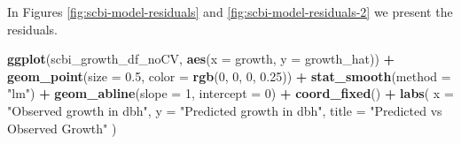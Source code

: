 \documentclass[12pt]{article}
\newenvironment{Shaded}{\begin{snugshade}}{\end{snugshade}}
\newcommand{\CommentTok}[1]{\textcolor[rgb]{0.56,0.35,0.01}{\textit{#1}}}
\newcommand{\DataTypeTok}[1]{\textcolor[rgb]{0.13,0.29,0.53}{#1}}
\newcommand{\DecValTok}[1]{\textcolor[rgb]{0.00,0.00,0.81}{#1}}
\newcommand{\FloatTok}[1]{\textcolor[rgb]{0.00,0.00,0.81}{#1}}
\newcommand{\KeywordTok}[1]{\textcolor[rgb]{0.13,0.29,0.53}{\textbf{#1}}}
\newcommand{\NormalTok}[1]{#1}
\newcommand{\OperatorTok}[1]{\textcolor[rgb]{0.81,0.36,0.00}{\textbf{#1}}}
\newcommand{\OtherTok}[1]{\textcolor[rgb]{0.56,0.35,0.01}{#1}}
\newcommand{\StringTok}[1]{\textcolor[rgb]{0.31,0.60,0.02}{#1}}
\begin{document}
\begin{Shaded}
\end{Shaded}

\begin{Shaded}
\end{Shaded}

\begin{Shaded}
\end{Shaded}

In Figures \ref{fig:scbi-model-residuals} and
\ref{fig:scbi-model-residuals-2} we present the residuals.

\begin{Shaded}
\begin{Highlighting}[]
\KeywordTok{ggplot}\NormalTok{(scbi_growth_df_noCV, }\KeywordTok{aes}\NormalTok{(}\DataTypeTok{x =}\NormalTok{ growth, }\DataTypeTok{y =}\NormalTok{ growth_hat)) }\OperatorTok{+}
\StringTok{  }\KeywordTok{geom_point}\NormalTok{(}\DataTypeTok{size =} \FloatTok{0.5}\NormalTok{, }\DataTypeTok{color =} \KeywordTok{rgb}\NormalTok{(}\DecValTok{0}\NormalTok{, }\DecValTok{0}\NormalTok{, }\DecValTok{0}\NormalTok{, }\FloatTok{0.25}\NormalTok{)) }\OperatorTok{+}
\StringTok{  }\KeywordTok{stat_smooth}\NormalTok{(}\DataTypeTok{method =} \StringTok{"lm"}\NormalTok{) }\OperatorTok{+}
\StringTok{  }\KeywordTok{geom_abline}\NormalTok{(}\DataTypeTok{slope =} \DecValTok{1}\NormalTok{, }\DataTypeTok{intercept =} \DecValTok{0}\NormalTok{) }\OperatorTok{+}
\StringTok{  }\KeywordTok{coord_fixed}\NormalTok{() }\OperatorTok{+}
\StringTok{  }\KeywordTok{labs}\NormalTok{(}
    \DataTypeTok{x =} \StringTok{"Observed growth in dbh"}\NormalTok{, }\DataTypeTok{y =} \StringTok{"Predicted growth in dbh"}\NormalTok{,}
    \DataTypeTok{title =} \StringTok{"Predicted vs Observed Growth"}
\NormalTok{  )}
\end{Highlighting}
\end{Shaded}
\end{document}
